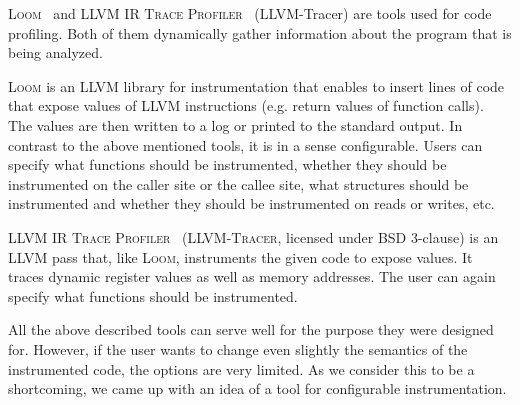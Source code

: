 \textsc{Loom}~\cite{loom} and \textsc{LLVM IR Trace Profiler}~\cite{tracer}
(LLVM-Tracer) are tools used for code profiling. Both of them dynamically
gather information about the program that is being analyzed.

\textsc{Loom} is an LLVM library for instrumentation that enables
to insert lines of code that expose values of LLVM instructions (e.g. return
values of function calls). The values are then written to a log or printed to
the standard output. In contrast to the above mentioned tools, it is in a sense
configurable. Users can specify what functions should be instrumented, whether
they should be instrumented on the caller site or the callee site, what
structures should be instrumented and whether they should be instrumented on
reads or writes, etc.

\textsc{LLVM IR Trace Profiler}~\cite{tracer} (\textsc{LLVM-Tracer}, licensed
under BSD 3-clause) is an LLVM pass that, like \textsc{Loom}, instruments the
given code to expose values. It traces dynamic register values as well as
memory addresses. The user can again specify what functions should be
instrumented.

All the above described tools can serve well for the purpose they were designed
for. However, if the user wants to change even slightly the semantics of the
instrumented code, the options are very limited. As we consider this to be
a shortcoming, we came up with an idea of a tool for configurable
instrumentation.
